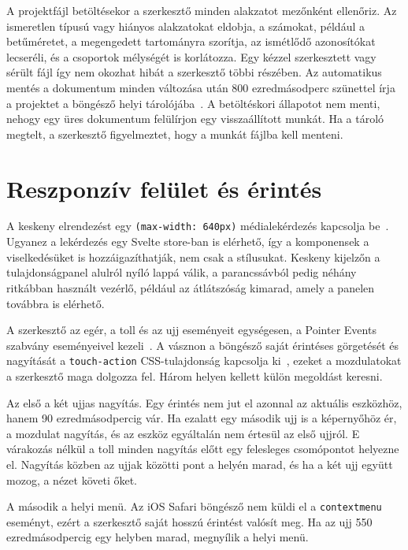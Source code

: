A projektfájl betöltésekor a szerkesztő minden alakzatot mezőnként ellenőriz. Az ismeretlen típusú vagy hiányos alakzatokat eldobja, a számokat, például a betűméretet, a megengedett tartományra szorítja, az ismétlődő azonosítókat lecseréli, és a csoportok mélységét is korlátozza. Egy kézzel szerkesztett vagy sérült fájl így nem okozhat hibát a szerkesztő többi részében. Az automatikus mentés a dokumentum minden változása után 800 ezredmásodperc szünettel írja a projektet a böngésző helyi tárolójába~\cite{whatwg-webstorage}. A betöltéskori állapotot nem menti, nehogy egy üres dokumentum felülírjon egy visszaállított munkát. Ha a tároló megtelt, a szerkesztő figyelmeztet, hogy a munkát fájlba kell menteni.

\section{Reszponzív felület és érintés}
\label{sec:touch}

A keskeny elrendezést egy \texttt{(max-width: 640px)} médialekérdezés kapcsolja be~\cite{mdn-media-queries}. Ugyanez a lekérdezés egy Svelte store-ban is elérhető, így a komponensek a viselkedésüket is hozzáigazíthatják, nem csak a stílusukat. Keskeny kijelzőn a tulajdonságpanel alulról nyíló lappá válik, a parancssávból pedig néhány ritkábban használt vezérlő, például az átlátszóság kimarad, amely a panelen továbbra is elérhető.

A szerkesztő az egér, a toll és az ujj eseményeit egységesen, a Pointer Events szabvány eseményeivel kezeli~\cite{w3c-pointer-events}. A vásznon a böngésző saját érintéses görgetését és nagyítását a \texttt{touch-action} CSS-tulajdonság kapcsolja ki~\cite{mdn-touch-action}, ezeket a mozdulatokat a szerkesztő maga dolgozza fel. Három helyen kellett külön megoldást keresni.

Az első a két ujjas nagyítás. Egy érintés nem jut el azonnal az aktuális eszközhöz, hanem 90 ezredmásodpercig vár. Ha ezalatt egy második ujj is a képernyőhöz ér, a mozdulat nagyítás, és az eszköz egyáltalán nem értesül az első ujjról. E várakozás nélkül a toll minden nagyítás előtt egy felesleges csomópontot helyezne el. Nagyítás közben az ujjak közötti pont a helyén marad, és ha a két ujj együtt mozog, a nézet követi őket.

A második a helyi menü. Az iOS Safari böngésző nem küldi el a \texttt{contextmenu} eseményt, ezért a szerkesztő saját hosszú érintést valósít meg. Ha az ujj 550 ezredmásodpercig egy helyben marad, megnyílik a helyi menü.

